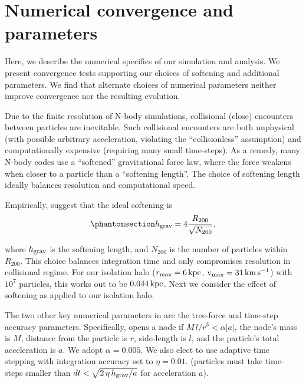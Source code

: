 \chapter{Numerical convergence and
parameters}\label{sec:extra_convergence}

Here, we describe the numerical specifics of our simulation and
analysis. We present convergence tests supporting our choices of
softening and additional parameters. We find that alternate choices of
numerical parameters neither improve convergence nor the resulting
evolution.

Due to the finite resolution of N-body simulations, collisional (close)
encounters between particles are inevitable. Such collisional encounters
are both unphysical (with possible arbitrary acceleration, violating the
``collisionless'' assumption) and computationally expensive (requiring
many small time-steps). As a remedy, many N-body codes use a
``softened'' gravitational force law, where the force weakens when
closer to a particle than a ``softening length''. The choice of
softening length ideally balances resolution and computational speed.

Empirically, \citet{power+2003} suggest that the ideal softening is
\begin{equation}\protect\phantomsection\label{eq:power_softening}{
h_{\rm grav} = 4 \frac{R_{200}}{\sqrt{N_{200}}},
}\end{equation}

where \(h_{\rm grav}\) is the softening length, and \(N_{200}\) is the
number of particles within \(R_{200}\). This choice balances integration
time and only compromises resolution in collisional regime. For our
isolation halo (\(r_{\rm max}=6\,{\rm kpc}\), \({\rm v}_{\rm max}=31\,{\rm km\,s^{-1}}\)) with \(10^7\)
particles, this works out to be \(0.044\,{\rm kpc}\). Next we consider
the effect of softening as applied to our isolation halo.

The two other key numerical parameters in \gadget{} are the tree-force
and time-step accuracy parameters. Specifically, \gadget{} opens a node
if \(M\,l/r^3 < \alpha |a|\), the node's mass is \(M\), distance from
the particle is \(r\), side-length is \(l\), and the particle's total
acceleration is \(a\). We adopt \(\alpha =0.005\). We also elect to use
adaptive time stepping with integration accuracy set to \(\eta=0.01\).
(particles must take time-steps smaller than
\(dt < \sqrt{2\,\eta\,h_{\rm grav} / a}\) for acceleration \(a\)).

